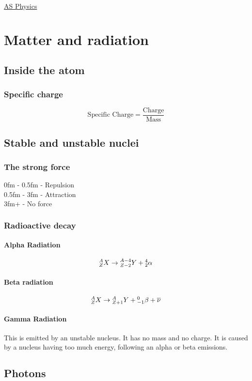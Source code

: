 \documentclass{article}[18pt]
\begin{document}
\begin{center}
\underline{\huge AS Physics}
\end{center}
\section{Matter and radiation}
\subsection{Inside the atom}
\subsubsection{Specific charge}
$$\text{Specific Charge}=\dfrac{\text{Charge}}{\text{Mass}}$$
\subsection{Stable and unstable nuclei}
\subsubsection{The strong force}
0fm - 0.5fm - Repulsion\\
0.5fm - 3fm - Attraction\\
3fm+ - No force\\
\subsubsection{Radioactive decay}
\paragraph{Alpha Radiation}
$$\mathsmaller{^A_Z}X\rightarrow\mathsmaller{^{A-4}_{Z-2}}Y+\mathsmaller{^4_2}\alpha$$
\paragraph{Beta radiation}
$$\mathsmaller{^A_Z}X\rightarrow\mathsmaller{^{A}_{Z+1}}Y+\mathsmaller{^0_{-1}}\beta+\overline{\nu}$$
\paragraph{Gamma Radiation}
This is emitted by an unstable nucleus. It has no mass and no charge. It is caused by a nucleus having too much energy, following an alpha or beta emissions.
\subsection{Photons}
\end{document}
